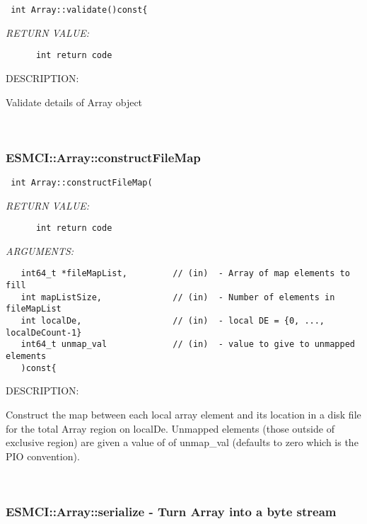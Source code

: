   
\begin{verbatim} int Array::validate()const{\end{verbatim}{\em RETURN VALUE:}
\begin{verbatim}      int return code\end{verbatim}
{\sf DESCRIPTION:\\ }


      Validate details of Array object
   
 
\mbox{}\hrulefill\
 
\subsubsection [ESMCI::Array::constructFileMap] {ESMCI::Array::constructFileMap}


  
\begin{verbatim} int Array::constructFileMap(\end{verbatim}{\em RETURN VALUE:}
\begin{verbatim}      int return code\end{verbatim}{\em ARGUMENTS:}
\begin{verbatim}   int64_t *fileMapList,         // (in)  - Array of map elements to fill
   int mapListSize,              // (in)  - Number of elements in fileMapList
   int localDe,                  // (in)  - local DE = {0, ..., localDeCount-1}
   int64_t unmap_val             // (in)  - value to give to unmapped elements
   )const{\end{verbatim}
{\sf DESCRIPTION:\\ }


      Construct the map between each local array element and its location
      in a disk file for the total Array region on localDe.
      Unmapped elements (those outside of exclusive region) are given a value
      of of unmap_val (defaults to zero which is the PIO convention).
   
 
\mbox{}\hrulefill\
 
\subsubsection [ESMCI::Array::serialize] {ESMCI::Array::serialize - Turn Array into a byte stream}


